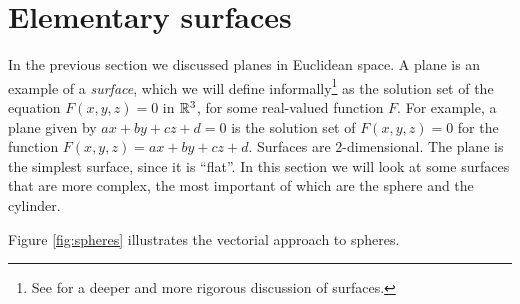 \newpage
\section{Elementary surfaces}
In the previous section we discussed planes in Euclidean space. A plane is an example of a \emph{surface}, which we
will define informally\footnote{See \cite{one} for a deeper and more rigorous discussion of surfaces.} as the
solution set of the equation $F(x,y,z) = 0$ in $\mathbb{R}^{3}$, for some real-valued function $F$. For example, a plane
given by $ax + by + cz + d = 0$ is the solution set of $F(x,y,z) = 0$ for the function $F(x,y,z) = ax + by + cz + d$.
Surfaces are 2-dimensional. The plane is the simplest surface, since it is ``flat''. In this
section we will look at some surfaces that are more complex, the most important of which are the sphere and the
cylinder.


Figure \ref{fig:spheres} illustrates the vectorial approach to spheres.

